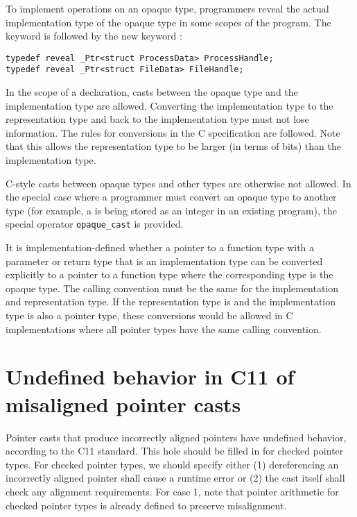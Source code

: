 To implement operations on an opaque type,
programmers reveal the actual implementation type of the opaque type
in some scopes of the program.  The
keyword  is followed by the new keyword :
\begin{lstlisting}
typedef reveal _Ptr<struct ProcessData> ProcessHandle;
typedef reveal _Ptr<struct FileData> FileHandle;
\end{lstlisting}
In the scope of a  declaration, casts between the
opaque type and the implementation type are allowed.  
Converting the implementation type to the representation
type and back to the implementation type must not lose information.  
The rules for conversions in the C specification are followed.   Note that 
this allows the representation type to be larger (in terms of bits) than the implementation type.

C-style casts between opaque types and other types are otherwise not allowed.
In the special case where a programmer must convert an opaque type to another
type (for example, a \uncheckedptrvoid{} is being stored as an integer in an existing
program), the special operator \lstinline|opaque_cast| is provided.

It is implementation-defined whether a pointer to a function type with a
parameter or return type that is an implementation type can be converted
explicitly to a pointer to a function type where the corresponding type
is the opaque type.   The calling convention must be the same for
the implementation and representation type.  If the representation type is \uncheckedptrvoid{}
and the implementation type is also a pointer type,  these conversions would be
allowed in C implementations where all pointer types have the same calling convention.



\section{Undefined behavior in C11 of misaligned pointer casts}

Pointer casts that produce incorrectly aligned pointers have undefined
behavior, according to the C11 standard. This hole should be filled in
for checked pointer types. For checked pointer types, we should specify
either (1) dereferencing an incorrectly aligned pointer shall cause a
runtime error or (2) the cast itself shall check any alignment
requirements. For case 1, note that pointer arithmetic for checked pointer types
is already
defined to preserve misalignment. 

